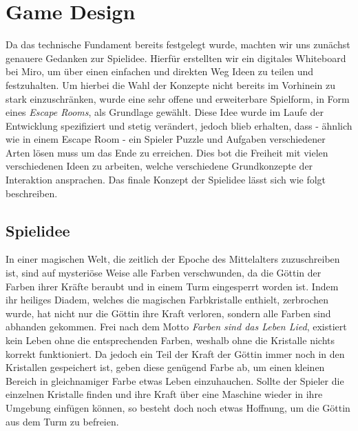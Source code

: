 \chapter{Game Design}
Da das technische Fundament bereits festgelegt wurde, machten wir uns zunächst genauere Gedanken zur Spielidee. Hierfür erstellten wir ein digitales Whiteboard bei Miro, um über einen einfachen und direkten Weg Ideen zu teilen und festzuhalten. Um hierbei die Wahl der Konzepte nicht bereits im Vorhinein zu stark einzuschränken, wurde eine sehr offene und erweiterbare Spielform, in Form eines \textit{Escape Rooms}, als Grundlage gewählt. Diese Idee wurde im Laufe der Entwicklung spezifiziert und stetig verändert, jedoch blieb erhalten, dass - ähnlich wie in einem Escape Room - ein Spieler Puzzle und Aufgaben verschiedener Arten lösen muss um das Ende zu erreichen. Dies bot die Freiheit mit vielen verschiedenen Ideen zu arbeiten, welche verschiedene Grundkonzepte der Interaktion ansprachen. Das finale Konzept der Spielidee lässt sich wie folgt beschreiben.
\section{Spielidee}
In einer magischen Welt, die zeitlich der Epoche des Mittelalters zuzuschreiben ist, sind auf mysteriöse Weise alle Farben verschwunden, da die Göttin der Farben ihrer Kräfte beraubt und in einem Turm eingesperrt worden ist. Indem ihr heiliges Diadem, welches die magischen Farbkristalle enthielt, zerbrochen wurde, hat nicht nur die Göttin ihre Kraft verloren, sondern alle Farben sind abhanden gekommen. Frei nach dem Motto \textit{Farben sind das Leben Lied}, existiert kein Leben ohne die entsprechenden Farben, weshalb ohne die Kristalle nichts korrekt funktioniert. Da jedoch ein Teil der Kraft der Göttin immer noch in den Kristallen gespeichert ist, geben diese genügend Farbe ab, um einen kleinen Bereich in gleichnamiger Farbe etwas Leben einzuhauchen. Sollte der Spieler die einzelnen Kristalle finden und ihre Kraft über eine Maschine wieder in ihre Umgebung einfügen können, so besteht doch noch etwas Hoffnung, um die Göttin aus dem Turm zu befreien.\\

